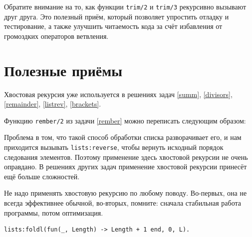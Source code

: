 \documentclass[
  paper=a4,
  fontsize=14pt,
  openany,
  appendixprefix=true
]{scrbook}
\begin{document}



Обратите внимание на то, как функции \lstinline{trim/2} и \lstinline{trim/3} рекурсивно вызывают друг друга. Это полезный приём, который позволяет упростить отладку и тестирование, а также улучшить читаемость кода за счёт избавления от громоздких операторов ветвления.






\section*{Полезные приёмы}


Хвостовая рекурсия уже используется в решениях задач \ref{summ}, \ref{divisors}, \ref{remainder}, \ref{listrev}, \ref{brackets}.


Функцию \lstinline{rember/2} из задачи \ref{rember} можно переписать следующим образом:



Проблема в том, что такой способ обработки списка разворачивает его, и нам приходится вызывать \lstinline{lists:reverse}, чтобы вернуть исходный порядок следования элементов. Поэтому применение здесь хвостовой рекурсии не очень оправдано. В решениях других задач применение хвостовой рекурсии принесёт ещё больше сложностей.

Не надо применять хвостовую рекурсию по любому поводу. Во-первых, она не всегда эффективнее обычной, во-вторых, помните: сначала стабильная работа программы, потом оптимизация.



\pagebreak




\begin{lstlisting}
lists:foldl(fun(_, Length) -> Length + 1 end, 0, L).
\end{lstlisting}
\end{document}
